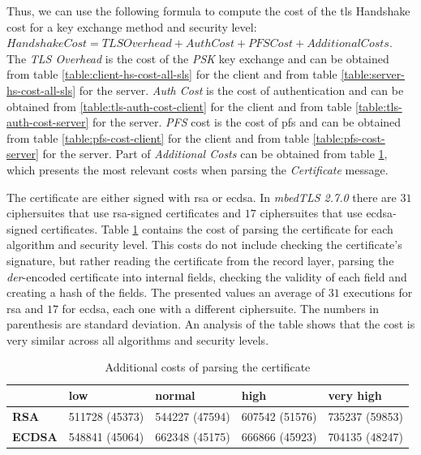 \documentclass{llncs}
\begin{document}
Thus, we can use the following formula to compute the cost of the \gls{tls} Handshake cost for a key exchange method and
security level: $Handshake Cost = TLS Overhead + Auth Cost + PFS Cost + Additional Costs$. The \textit{TLS Overhead} is the cost of the
\textit{PSK} key exchange and can be obtained from table \ref{table:client-hs-cost-all-sls} for the client
and from table \ref{table:server-hs-cost-all-sls} for the server. \textit{Auth Cost} is the cost of authentication and can be obtained
from \ref{table:tls-auth-cost-client} for the client and from table \ref{table:tls-auth-cost-server} for the server. \textit{PFS} cost
is the cost of \gls{pfs} and can be obtained from table \ref{table:pfs-cost-client} for the client and from table \ref{table:pfs-cost-server}
for the server. Part of \textit{Additional Costs} can be obtained from table \ref{table:cert-parse-cost}, which presents the most relevant
costs when parsing the \textit{Certificate} message.

The certificate are either signed with
\gls{rsa} or \gls{ecdsa}. In \textit{mbedTLS 2.7.0} there are $31$ ciphersuites that use \gls{rsa}-signed certificates and $17$ ciphersuites
that use \gls{ecdsa}-signed certificates. Table \ref{table:cert-parse-cost} contains the cost of parsing the certificate for each algorithm
and security level. This costs do not include checking the certificate's signature, but rather reading the certificate from the record layer,
parsing the \textit{der}-encoded certificate into internal fields, checking the validity of each field and creating a hash of the fields.
The presented values an average of $31$ executions for \gls{rsa} and $17$ for \gls{ecdsa}, each one with a
different ciphersuite. The numbers in parenthesis are standard deviation. An analysis of the table shows that the cost is very similar across all
algorithms and security levels.

\begin{table}[]
\begin{tabular}{|l|l|l|l|l|}
\hline
               & \textbf{low}   & \textbf{normal} & \textbf{high} & \textbf{very high} \\ \hline
\textbf{RSA}   & 511728 (45373) & 544227 (47594)  & 607542 (51576) & 735237 (59853)      \\ \hline
\textbf{ECDSA} & 548841 (45064) & 662348 (45175) & 666866 (45923)  & 704135 (48247)        \\ \hline
\end{tabular}
\centering \caption{ \label{table:cert-parse-cost} Additional costs of parsing the certificate}

\end{table}
\end{document}
